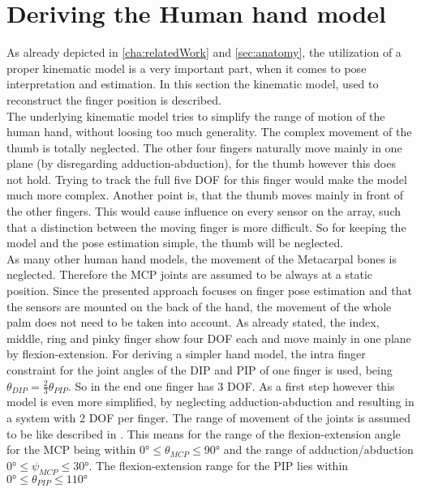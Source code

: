 \section{Deriving the Human hand model} \label{sec:handModel}

As already depicted in \ref{cha:relatedWork} and \ref{sec:anatomy}, the utilization of a proper kinematic model is a very important part, when it comes to pose interpretation and estimation. In this section the kinematic model, used to reconstruct the finger position is described.\\
The underlying kinematic model tries to simplify the range of motion of the human hand, without loosing too much generality. The complex movement of the thumb is totally neglected. The other four fingers naturally move mainly in one plane (by disregarding adduction-abduction), for the thumb however this does not hold. Trying to track the full five \ac{DOF} for this finger would make the model much more complex. Another point is, that the thumb moves mainly \grqq in front \grqq of the other fingers. This would cause influence on every sensor on the array, such that a distinction between the moving finger is more difficult. So for keeping the model and the pose estimation simple, the thumb will be neglected.\\
As many other human hand models, the movement of the Metacarpal bones is neglected. Therefore the \ac{MCP} joints are assumed to be always at a static position. Since the presented approach focuses on finger pose estimation and that the sensors are mounted on the back of the hand, the movement of the whole palm does not need to be taken into account. As already stated, the index, middle, ring and pinky finger show four \ac{DOF} each and move mainly in one plane by flexion-extension. For deriving a simpler hand model, the intra finger constraint for the joint angles of the \ac{DIP} and \ac{PIP} of one finger is used, being $ \theta_{DIP} = \frac{2}{3} \theta_{PIP} $. So in the end one finger has 3 \ac{DOF}. As a first step however this model is even more simplified, by neglecting adduction-abduction and resulting in a system with 2 \ac{DOF} per finger. The range of movement of the joints is assumed to be like described in \cite{lin2000modeling}. This means for the range of the flexion-extension angle for the \ac{MCP} being within $ \ang{0} \leq \theta_{MCP} \leq \ang{90} $ and the range of adduction/abduction $ \ang{0} \leq \psi_{MCP} \leq \ang{30} $. The flexion-extension range for the \ac{PIP} lies within $ \ang{0} \leq \theta_{PIP} \leq \ang{110} $\\

